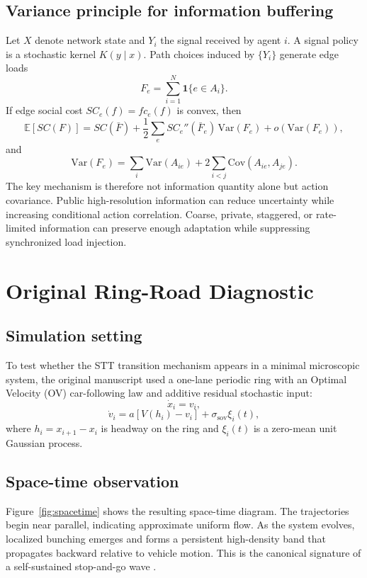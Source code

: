 \documentclass[11pt]{article}
\begin{document}
\subsection{Variance principle for information buffering}
Let $X$ denote network state and $Y_i$ the signal received by agent $i$. A signal policy is a stochastic kernel $K(y\mid x)$. Path choices induced by $\{Y_i\}$ generate edge loads
\begin{equation}
F_e=\sum_{i=1}^{N}\mathbf 1\{e\in A_i\}.
\end{equation}
If edge social cost $SC_e(f)=fc_e(f)$ is convex, then
\begin{equation}
\mathbb E[SC(F)]=SC(\bar F)+\frac{1}{2}\sum_e SC_e''(\bar F_e)\,\mathrm{Var}(F_e)+o(\mathrm{Var}(F_e)),
\end{equation}
and
\begin{equation}
\mathrm{Var}(F_e)=\sum_i\mathrm{Var}(A_{ie})+2\sum_{i<j}\mathrm{Cov}(A_{ie},A_{je}).
\end{equation}
The key mechanism is therefore not information quantity alone but action covariance. Public high-resolution information can reduce uncertainty while increasing conditional action correlation. Coarse, private, staggered, or rate-limited information can preserve enough adaptation while suppressing synchronized load injection.

\section{Original Ring-Road Diagnostic}
\subsection{Simulation setting}
To test whether the STT transition mechanism appears in a minimal microscopic system, the original manuscript used a one-lane periodic ring with an Optimal Velocity (OV) car-following law \cite{Bando1995} and additive residual stochastic input:
\begin{equation}
\dot{x}_i=v_i,
\end{equation}
\begin{equation}
\dot{v}_i=a[V(h_i)-v_i]+\sigma_{\mathrm{sov}}\xi_i(t),
\end{equation}
where $h_i=x_{i+1}-x_i$ is headway on the ring and $\xi_i(t)$ is a zero-mean unit Gaussian process.

\subsection{Space-time observation}
Figure~\ref{fig:spacetime} shows the resulting space-time diagram. The trajectories begin near parallel, indicating approximate uniform flow. As the system evolves, localized bunching emerges and forms a persistent high-density band that propagates backward relative to vehicle motion. This is the canonical signature of a self-sustained stop-and-go wave \cite{Sugiyama2008}.
\end{document}
